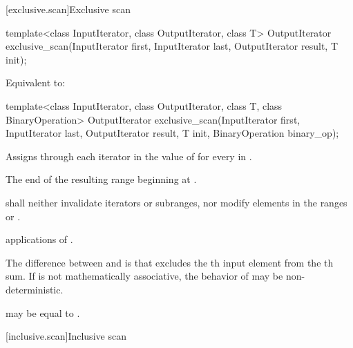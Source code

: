 [exclusive.scan]{Exclusive scan}

%
\begin{itemdecl}
template<class InputIterator, class OutputIterator, class T>
  OutputIterator exclusive_scan(InputIterator first, InputIterator last,
                                OutputIterator result,
                                T init);
\end{itemdecl}

\begin{itemdescr}
\pnum
\effects
Equivalent to: 
\end{itemdescr}

%
\begin{itemdecl}
template<class InputIterator, class OutputIterator, class T, class BinaryOperation>
  OutputIterator exclusive_scan(InputIterator first, InputIterator last,
                                OutputIterator result,
                                T init, BinaryOperation binary_op);
\end{itemdecl}

\begin{itemdescr}
\pnum
\effects
Assigns through each iterator  in  the value of
for every  in .

\pnum
\returns
The end of the resulting range beginning at .

\pnum
\requires
{} shall neither invalidate iterators or subranges, nor modify
elements in the
ranges  or .

\pnum
\complexity
{} applications of .

\pnum
\realnotes
The difference between  and  is
that  excludes the th input element from the
th sum. If  is not mathematically associative, the
behavior of  may be non-deterministic.

\pnum
\remarks
{} may be equal to .
\end{itemdescr}

[inclusive.scan]{Inclusive scan}


